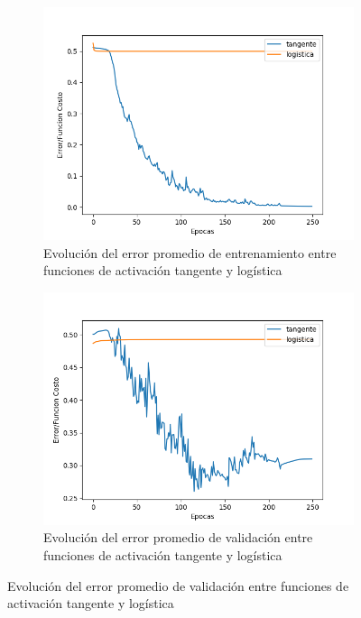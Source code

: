 \begin{figure}[!htbp]
\centering
\begin{subfigure}{.5\textwidth}
  \centering
  \includegraphics[width=1\linewidth]{graficos/factivaciones_promedios_entrenamiento_normal.png}
  \caption{Evolución del error promedio de entrenamiento entre funciones de activación tangente y logística}
  \label{fig:sub1}
\end{subfigure}%
\begin{subfigure}{.5\textwidth}
  \centering
  \includegraphics[width=1\linewidth]{graficos/factivaciones_promedios_validacion_normal.png}
  \caption{Evolución del error promedio de validación entre funciones de activación tangente y logística}
  \label{fig:sub2}
\end{subfigure}
\end{figure}

